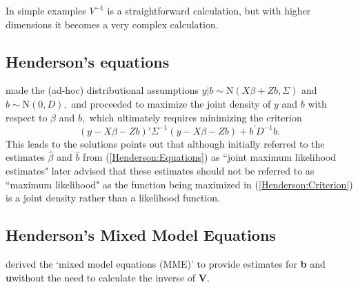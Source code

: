 \documentclass[12pt, a4paper]{report}
\theoremstyle{plain}
\theoremstyle{definition}
\theoremstyle{remark}
\begin{document}
In simple examples $V^{-1}$ is a straightforward calculation, but
with higher dimensions it becomes a very complex calculation.

\subsection{Henderson's equations}

\cite{Henderson:1950} made the (ad-hoc) distributional assumptions $y|b \sim \mathrm{N} (X \beta + Zb, \Sigma)$ and $b \sim \mathrm{N}(0,D),$ and proceeded to maximize the joint density of $y$ and $b$
with respect to $\beta$ and $b,$ which ultimately requires minimizing the criterion
\begin{equation}
(y - X \beta -Zb)'\Sigma^{-1}(y - X \beta -Zb) + b^\prime D^{-1}b. 
\label{Henderson:Criterion}
\end{equation}
This leads to the solutions
\cite{Robi:BLUP:1991} points out that although \cite{Henderson:1950} initially referred to the estimates $\hat{\beta}$ and $\hat{b}$ from (\ref{Henderson:Equations}) as ``joint maximum likelihood estimates" \cite{Henderson:1973} later advised that these estimates should not be referred to as ``maximum likelihood" as the function being maximized in (\ref{Henderson:Criterion}) is a joint density rather than a likelihood function.

\subsection{Henderson's Mixed Model Equations}
\citet{Henderson50, Henderson63, Henderson73,
	Henderson84a} derived the `mixed model equations (MME)' to provide
estimates for \textbf{b} and \textbf{u}without the need to
calculate the inverse of \textbf{V}.
\end{document}
